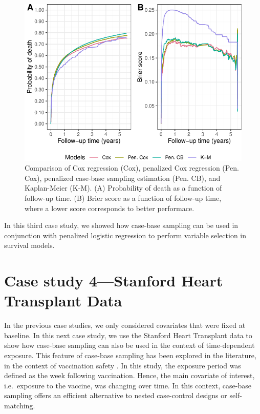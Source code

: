 \documentclass[
]{jss}
\begin{document}
\begin{CodeChunk}
\begin{figure}[ht]

{\centering \includegraphics[width=\textwidth,keepaspectratio=true]{../figures/riskregressionBrier-1} 

}

\caption{\label{fig:cs3FinalBrier} Comparison of Cox regression (Cox), penalized Cox regression (Pen. Cox), penalized case-base sampling estimation (Pen. CB), and Kaplan-Meier (K-M). (A)  Probability of death as a function of follow-up time. (B) Brier score as a function of follow-up time, where a lower score corresponds to better performace.}\label{fig:riskregressionBrier}
\end{figure}
\end{CodeChunk}

In this third case study, we showed how case-base sampling can be used
in conjunction with penalized logistic regression to perform variable
selection in survival models.

\hypertarget{case-study-4stanford-heart-transplant-data}{%
\section{Case study 4---Stanford Heart Transplant
Data}\label{case-study-4stanford-heart-transplant-data}}

In the previous case studies, we only considered covariates that were
fixed at baseline. In this next case study, we use the Stanford Heart
Transplant data \citep[\citet{crowley1977covariance}]{clark1971cardiac}
to show how case-base sampling can also be used in the context of
time-dependent exposure. This feature of case-base sampling has been
explored in the literature, in the context of vaccination safety
\citep{saarela2015case}. In this study, the exposure period was defined
as the week following vaccination. Hence, the main covariate of
interest, i.e.~exposure to the vaccine, was changing over time. In this
context, case-base sampling offers an efficient alternative to nested
case-control designs or self-matching.
\end{document}

